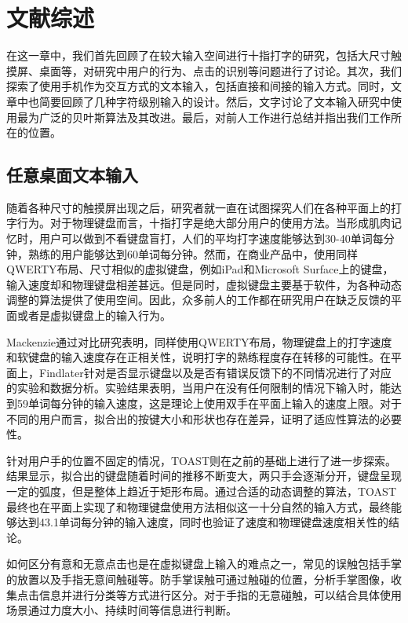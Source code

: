 \chapter{文献综述}
\label{cha:literature}
在这一章中，我们首先回顾了在较大输入空间进行十指打字的研究，包括大尺寸触摸屏、桌面等，对研究中用户的行为、点击的识别等问题进行了讨论。其次，我们探索了使用手机作为交互方式的文本输入，包括直接和间接的输入方式。同时，文章中也简要回顾了几种字符级别输入的设计。然后，文字讨论了文本输入研究中使用最为广泛的贝叶斯算法及其改进。最后，对前人工作进行总结并指出我们工作所在的位置。

\section{任意桌面文本输入} %
随着各种尺寸的触摸屏出现之后，研究者就一直在试图探究人们在各种平面上的打字行为。对于物理键盘而言，十指打字是绝大部分用户的使用方法。当形成肌肉记忆时，用户可以做到不看键盘盲打，人们的平均打字速度能够达到30-40单词每分钟，熟练的用户能够达到60单词每分钟\cite{flatglass2011findlater}。然而，在商业产品中，使用同样QWERTY布局、尺寸相似的虚拟键盘，例如iPad和Microsoft Surface上的键盘，输入速度却和物理键盘相差甚远。但是同时，虚拟键盘主要基于软件，为各种动态调整的算法提供了使用空间。因此，众多前人的工作都在研究用户在缺乏反馈的平面或者是虚拟键盘上的输入行为。

Mackenzie通过对比研究表明\cite{mackenzie2001empirical}，同样使用QWERTY布局，物理键盘上的打字速度和软键盘的输入速度存在正相关性，说明打字的熟练程度存在转移的可能性。在平面上，Findlater针对是否显示键盘以及是否有错误反馈下的不同情况进行了对应的实验和数据分析\cite{flatglass2011findlater}。实验结果表明，当用户在没有任何限制的情况下输入时，能达到59单词每分钟的输入速度，这是理论上使用双手在平面上输入的速度上限。对于不同的用户而言，拟合出的按键大小和形状也存在差异，证明了适应性算法的必要性。

针对用户手的位置不固定的情况，TOAST\cite{2018shitoast}则在之前的基础上进行了进一步探索。结果显示，拟合出的键盘随着时间的推移不断变大，两只手会逐渐分开，键盘呈现一定的弧度，但是整体上趋近于矩形布局。通过合适的动态调整的算法，TOAST\cite{2018shitoast}最终也在平面上实现了和物理键盘使用方法相似这一十分自然的输入方式，最终能够达到43.1单词每分钟的输入速度，同时也验证了速度和物理键盘速度相关性的结论\cite{mackenzie2001empirical}。


如何区分有意和无意点击也是在虚拟键盘上输入的难点之一，常见的误触包括手掌的放置以及手指无意间触碰等。防手掌误触可通过触碰的位置\cite{2018shitoast}，分析手掌图像\cite{ewerling2012finger}，收集点击信息并进行分类\cite{schwarz2014probabilistic}等方式进行区分。对于手指的无意碰触，可以结合具体使用场景通过力度大小、持续时间等信息进行判断。

